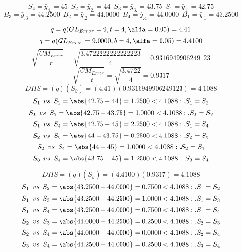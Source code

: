 $$S_{4}=\bar{y}_{4.}=45 \enspace S_{2}=\bar{y}_{2.}=44 \enspace S_{3}=\bar{y}_{3.}=43.75 \enspace S_{1}=\bar{y}_{1.}=42.75$$
$$B_{3}=\bar{y}_{.3}=44.2500 \enspace B_{2}=\bar{y}_{.2}=44.0000 \enspace B_{4}=\bar{y}_{.4}=44.0000 \enspace B_{1}=\bar{y}_{.1}=43.2500$$

$$q=q(GL_{Error}=9, t=4, \alfa=0.05)=4.41$$
$$q=q(GL_{Error}=9.0000, b=4, \alfa=0.05)=4.4100$$
$$\sqrt{\frac{CM_{Error}}{r}}=\sqrt{\frac{3.4722222222222223}{4}}=0.9316949906249123$$
$$\sqrt{\frac{CM_{Error}}{t}}=\sqrt{\frac{3.4722}{4}}=0.9317$$
$$DHS=(q)(S_{\bar{y}})=(4.41)(0.9316949906249123)=4.1088$$
$$S_{1} \enspace vs \enspace S_{2} = \abs{42.75-44}=1.2500<4.1088:.S_{1}=S_{2}$$
$$S_{1} \enspace vs \enspace S_{3} = \abs{42.75-43.75}=1.0000<4.1088:.S_{1}=S_{3}$$
$$S_{1} \enspace vs \enspace S_{4} = \abs{42.75-45}=2.2500<4.1088:.S_{1}=S_{4}$$
$$S_{2} \enspace vs \enspace S_{3} = \abs{44-43.75}=0.2500<4.1088:.S_{2}=S_{3}$$
$$S_{2} \enspace vs \enspace S_{4} = \abs{44-45}=1.0000<4.1088:.S_{2}=S_{4}$$
$$S_{3} \enspace vs \enspace S_{4} = \abs{43.75-45}=1.2500<4.1088:.S_{3}=S_{4}$$

$$DHS=(q)(S_{\bar{y}})=(4.4100)(0.9317)=4.1088$$
$$S_{1} \enspace vs \enspace S_{2} = \abs{43.2500-44.0000}=0.7500<4.1088:.S_{1}=S_{2}$$
$$S_{1} \enspace vs \enspace S_{3} = \abs{43.2500-44.2500}=1.0000<4.1088:.S_{1}=S_{3}$$
$$S_{1} \enspace vs \enspace S_{4} = \abs{43.2500-44.0000}=0.7500<4.1088:.S_{1}=S_{4}$$
$$S_{2} \enspace vs \enspace S_{3} = \abs{44.0000-44.2500}=0.2500<4.1088:.S_{2}=S_{3}$$
$$S_{2} \enspace vs \enspace S_{4} = \abs{44.0000-44.0000}=0.0000<4.1088:.S_{2}=S_{4}$$
$$S_{3} \enspace vs \enspace S_{4} = \abs{44.2500-44.0000}=0.2500<4.1088:.S_{3}=S_{4}$$

